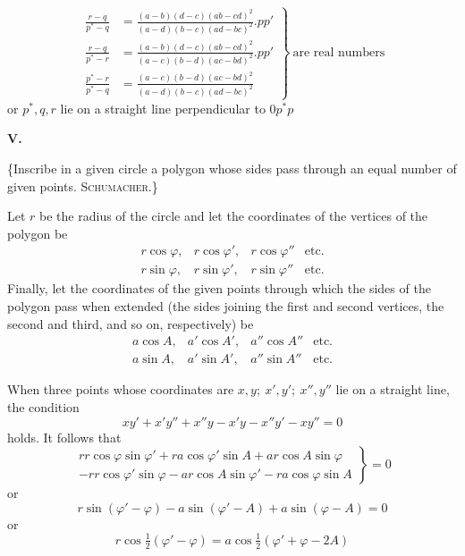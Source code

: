 %
\[
\left.\begin{aligned}
\frac{r-q}{p^*-q}&=\frac{(a-b)(d-c)(ab-cd)^2}{(a-d)(b-c)(ad-bc)^2}.pp'\\
\frac{r-q}{p^*-r}&=\frac{(a-b)(d-c)(ab-cd)^2}{(a-c)(b-d)(ac-bd)^2}.pp'\\
\frac{p^*-r}{p^*-q}&=\frac{(a-c)(b-d)(ac-bd)^2}{(a-d)(b-c)(ad-bc)^2}
\end{aligned}\right\}\ \text{are real numbers}
\]
or \(p^*,q,r\) lie on a straight line perpendicular to \(0p^*p\)
\par\medskip{}
\centerline{\textbf{V.}}\nobreak\smallskip
\{Inscribe in a given circle a polygon whose sides pass through an equal number of given points. \textsc{Schumacher}.\}

Let \(r\) be the radius of the circle and let the coordinates of the vertices of the polygon be
\[
\begin{array}{llll}
r\cos\varphi,&r\cos\varphi',&r\cos\varphi''&\text{etc.}\\
r\sin\varphi,&r\sin\varphi',&r\sin\varphi''&\text{etc.}
\end{array}
\]
Finally, let the coordinates of the given points through which the sides of the polygon pass when extended (the sides joining the first and second vertices, the second and third, and so on, respectively) be
\[
\begin{array}{llll}
a\cos A,&a'\cos A',&a''\cos A''&\text{etc.}\\
a\sin A,&a'\sin A',&a''\sin A''&\text{etc.}
\end{array}
\]
\par
When three points whose coordinates are \(x,y;\ x',y';\ x'',y''\) lie on a straight line, the condition
\[
xy'+x'y''+x''y-x'y-x''y'-xy''=0
\]
holds. It follows that
\[
\left.\begin{aligned}
rr\cos\varphi\sin\varphi'+ra\cos\varphi'\sin A+ar\cos A\sin\varphi\\
-rr\cos\varphi'\sin\varphi-ar\cos A\sin\varphi'-ra\cos\varphi\sin A
\end{aligned}\right\}=0
\]
or
\[
r\sin(\varphi'-\varphi)-a\sin(\varphi'-A)+a\sin(\varphi-A)=0
\]
or
\[
r\cos\tfrac12(\varphi'-\varphi)=a\cos\tfrac12(\varphi'+\varphi-2A)
\]

